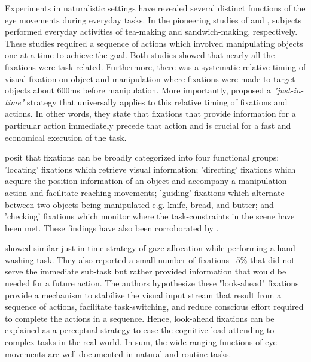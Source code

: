 Experiments in naturalistic settings have revealed several distinct functions of the eye movements during everyday tasks. In the pioneering studies of \citet{Land1999-ol} and \citet{Hayhoe2003-lw}, subjects performed everyday activities of tea-making and sandwich-making, respectively. These studies required a sequence of actions which involved manipulating objects one at a time to achieve the goal. Both studies showed that nearly all the fixations were task-related. Furthermore, there was a systematic relative timing of visual fixation on object and manipulation where fixations were made to target objects about 600ms before manipulation. More importantly, \citet{Ballard1995-ji} proposed a \emph{"just-in-time"} strategy that universally applies to this relative timing of fixations and actions. In other words, they state that fixations that provide information for a particular action immediately precede that action and is crucial for a fast and economical execution of the task.

\citet{Land2001-do} posit that fixations can be broadly categorized into four functional groups; 'locating' fixations which retrieve visual information; 'directing' fixations which acquire the position information of an object and accompany a manipulation action and facilitate reaching movements; 'guiding' fixations which alternate between two objects being manipulated e.g. knife, bread, and butter; and 'checking' fixations which monitor where the task-constraints in the scene have been met. These findings have also been corroborated by \citet{Pelz2001-cn, Mennie2007-my} .

\citet{Pelz2001-cn} showed similar just-in-time strategy of gaze allocation while performing a hand-washing task. They also reported a small number of fixations ~5\% that did not serve the immediate sub-task but rather provided information that would be needed for a future action. The authors hypothesize these "look-ahead" fixations provide a mechanism to stabilize the visual input stream that result from a sequence of actions, facilitate task-switching, and reduce conscious effort required to complete the actions in a sequence. Hence, look-ahead fixations can be explained as a perceptual strategy to ease the cognitive load attending to complex tasks in the real world. In sum, the wide-ranging functions of eye movements are well documented in natural and routine tasks.

